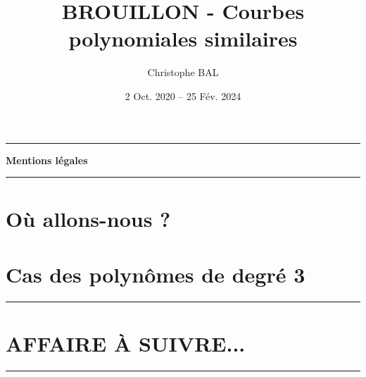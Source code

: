 \documentclass[12pt]{amsart}
\newcommand\contentdir{\jobname}
\begin{document}
\title{BROUILLON - Courbes polynomiales similaires}
\author{Christophe BAL}
\date{2 Oct. 2020 -- 25 Fév. 2024}
\maketitle


\begin{center}
	\hrule\vspace{.3em}
	{
		\fontsize{1.35em}{1em}\selectfont
		\textbf{Mentions \og légales \fg}
	}
			
	\vspace{0.45em}
	\doclicenseThis
	\hrule
\end{center}



\setcounter{tocdepth}{2}
\tableofcontents




\newpage
\section{Où allons-nous ?}






\section{Cas des polynômes de degré 3} 





%
%
%
%




\newpage
\bigskip

\hrule

\section{AFFAIRE À SUIVRE...}

\bigskip

\hrule
\end{document}
